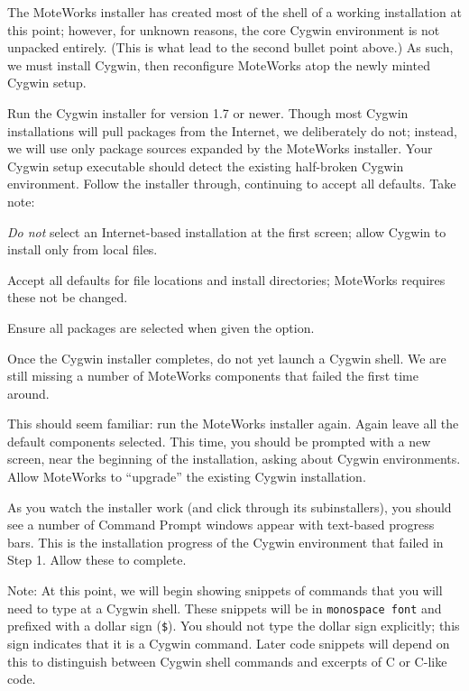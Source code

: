 \documentclass{article}
\begin{document}
The MoteWorks installer has created most of the shell of a working installation at this point; however, for unknown reasons, the core Cygwin environment is not unpacked entirely. (This is what lead to the second bullet point above.) As such, we must install Cygwin, then reconfigure MoteWorks atop the newly minted Cygwin setup.


Run the Cygwin installer for version 1.7 or newer. Though most Cygwin installations will pull packages from the Internet, we deliberately do not; instead, we will use only package sources expanded by the MoteWorks installer. Your Cygwin setup executable should detect the existing half-broken Cygwin environment. Follow the installer through, continuing to accept all defaults. Take note:

\begin{itemize*}
\item \textit{Do not} select an Internet-based installation at the first screen; allow Cygwin to install only from local files.
\item Accept all defaults for file locations and install directories; MoteWorks requires these not be changed.
\item Ensure all packages are selected when given the option.
\end{itemize*}

Once the Cygwin installer completes, do not yet launch a Cygwin shell. We are still missing a number of MoteWorks components that failed the first time around.


This should seem familiar: run the MoteWorks installer again. Again leave all the default components selected. This time, you should be prompted with a new screen, near the beginning of the installation, asking about Cygwin environments. Allow MoteWorks to ``upgrade'' the existing Cygwin installation.

As you watch the installer work (and click through its subinstallers), you should see a number of Command Prompt windows appear with text-based progress bars. This is the installation progress of the Cygwin environment that failed in Step 1. Allow these to complete.


Note: At this point, we will begin showing snippets of commands that you will need to type at a Cygwin shell. These snippets will be in \verb!monospace font! and prefixed with a dollar sign (\verb!$!). You should not type the dollar sign explicitly; this sign indicates that it is a Cygwin command. Later code snippets will depend on this to distinguish between Cygwin shell commands and excerpts of C or C-like code.
\end{document}
